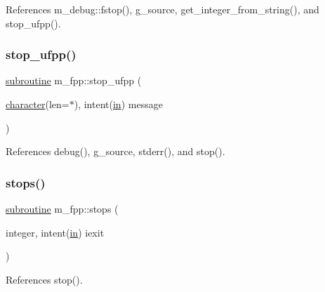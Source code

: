 References m\+\_\+debug\+::fstop(), g\+\_\+source, get\+\_\+integer\+\_\+from\+\_\+string(), and stop\+\_\+ufpp().

\mbox{\label{namespacem__fpp_a0cff320eaa7ee0c4ed98a6ecb9ecee0b}} 
\subsubsection{\texorpdfstring{stop\+\_\+ufpp()}{stop\_ufpp()}}
{\footnotesize\ttfamily \hyperlink{M__stopwatch_83_8txt_acfbcff50169d691ff02d4a123ed70482}{subroutine} m\+\_\+fpp\+::stop\+\_\+ufpp (\begin{DoxyParamCaption}\item[{\hyperlink{option__stopwatch_83_8txt_abd4b21fbbd175834027b5224bfe97e66}{character}(len=$\ast$), intent(\hyperlink{M__journal_83_8txt_afce72651d1eed785a2132bee863b2f38}{in})}]{message }\end{DoxyParamCaption})}



References debug(), g\+\_\+source, stderr(), and stop().

\mbox{\label{namespacem__fpp_a66a3f9b0087d5808a36fe4c19c47b51c}} 
\subsubsection{\texorpdfstring{stops()}{stops()}}
{\footnotesize\ttfamily \hyperlink{M__stopwatch_83_8txt_acfbcff50169d691ff02d4a123ed70482}{subroutine} m\+\_\+fpp\+::stops (\begin{DoxyParamCaption}\item[{integer, intent(\hyperlink{M__journal_83_8txt_afce72651d1eed785a2132bee863b2f38}{in})}]{iexit }\end{DoxyParamCaption})}



References stop().

\mbox{\label{namespacem__fpp_ad7c4d8aa34d0b35cd3b3ced65e261590}} 
